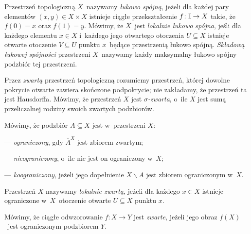 Przestrzeń topologiczną $X$~nazywamy \textit{łukowo spójną}, jeżeli dla każdej pary elementów $(x,y)\in X\times X$ istnieje ciągłe przekształcenie $f\colon \mathbb{I}\to X$ takie, że $f(0)=x$ oraz $f(1)=y$. Mówimy, że $X$~jest \textit{lokalnie łukowo spójna}, jeśli dla każdego elementu $x\in X$ i~każdego jego otwartego otoczenia $U\subseteq X$ istnieje otwarte otoczenie $V\subseteq U$ punktu $x$~będące przestrzenią łukowo spójną. \textit{Składową łukowej spójności} przestrzeni $X$~nazywamy każdy maksymalny łukowo spójny podzbiór tej przestrzeni.

Przez \textit{zwartą} przestrzeń topologiczną rozumiemy przestrzeń, której dowolne pokrycie otwarte zawiera skończone podpokrycie; nie zakładamy, że przestrzeń ta jest Hausdorffa. Mówimy, że przestrzeń $X$ jest \textit{$\sigma$-zwarta}, o~ile $X$ jest sumą przeliczalnej rodziny swoich zwartych podzbiorów.

Mówimy, że podzbiór $A\subseteq X$ jest w~przestrzeni $X$:
\begin{compactitem}
\item[---]\textit{ograniczony}, gdy $\overline{A}^X$ jest zbiorem zwartym;
\item[---]\textit{nieograniczony}, o~ile nie jest on ograniczony w~$X$;
\item[---]\textit{koograniczony}, jeżeli jego dopełnienie $X\smallsetminus A$ jest zbiorem ograniczonym w~$X$.
\end{compactitem}

Przestrzeń $X$ nazywamy \textit{lokalnie zwartą}, jeżeli dla każdego $x\in X$ istnieje ograniczone w~$X$~otoczenie otwarte $U\subseteq X$ punktu $x$. 

Mówimy, że ciągłe odwzorowanie $f\colon X\to Y$ jest \textit{zwarte}, jeżeli jego obraz $f(X)$~jest ograniczonym podzbiorem $Y$.

